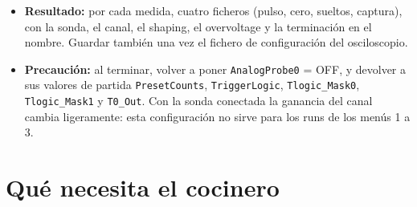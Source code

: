 \documentclass[11pt,a4paper]{article}
\begin{document}
\begin{itemize}
\begin{enumerate}
  \end{enumerate}
\item {\bf Resultado:} por cada medida, cuatro ficheros (pulso, cero,
  sueltos, captura), con la sonda, el canal, el shaping, el overvoltage y la
  terminación en el nombre. Guardar también una vez el fichero de
  configuración del osciloscopio.
\item {\bf Precaución:} al terminar, volver a poner \texttt{AnalogProbe0} =
  OFF, y devolver a sus valores de partida \texttt{PresetCounts},
  \texttt{TriggerLogic}, \texttt{Tlogic\_Mask0}, \texttt{Tlogic\_Mask1} y
  \texttt{T0\_Out}. Con la sonda conectada la ganancia del canal cambia
  ligeramente: esta configuración no sirve para los runs de los menús 1 a 3.
\end{itemize}

\section*{Qué necesita el cocinero}
\end{document}
